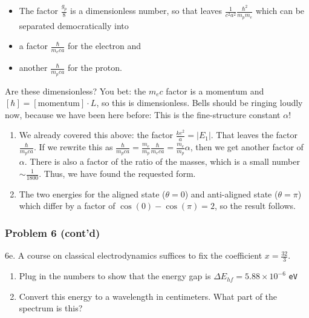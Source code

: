 \documentclass[11pt]{article}
\begin{document}
\begin{itemize}
\item
  The factor \(\frac{g_p}{8}\) is a dimensionless number, so that leaves
  \(\frac1{c^2 a^2}\frac{\hbar^2}{m_p m_e}\) which can be separated
  democratically into
\item
  a factor \(\frac{\hbar}{m_eca}\) for the electron and
\item
  another \(\frac{\hbar}{m_pca}\) for the proton.
\end{itemize}

Are these dimensionless? You bet: the \(m_e c\) factor is a momentum and
\([\hbar] = [\textrm{momentum}]\cdot L\), so this is dimensionless.
Bells should be ringing loudly now, because we have been here before:
This is the fine-structure constant \(\alpha\)!

\begin{enumerate}
\def\labelenumi{\roman{enumi}.}
\setcounter{enumi}{1}
\item
  We already covered this above: the factor \(\frac{ke^2}{a} = |E_1|\).
  That leaves the factor \(\frac{\hbar}{m_pca}\). If we rewrite this as
  \(\frac{\hbar}{m_pca}=\frac{m_e}{m_p}\frac{\hbar}{m_eca}=\frac{m_e}{m_p}\alpha\),
  then we get another factor of \(\alpha\). There is also a factor of
  the ratio of the masses, which is a small number
  \(\sim \frac 1{1800}\). Thus, we have found the requested form.
\item
  The two energies for the aligned state (\(\theta=0\)) and anti-aligned
  state (\(\theta=\pi\)) which differ by a factor of
  \(\cos(0)-\cos(\pi)=2\), so the result follows.
\end{enumerate}
 

     
\subsubsection{Problem 6 (cont'd)}\label{problem-6-contd}

6e. A course on classical electrodynamics suffices to fix the
coefficient \(x=\frac{32}3\).

\begin{enumerate}
\def\labelenumi{\roman{enumi}.}
\item
  Plug in the numbers to show that the energy gap is
  \(\Delta E_{hf} = 5.88\times 10^{-6}\) \texttt{eV}
\item
  Convert this energy to a wavelength in centimeters. What part of the
  spectrum is this?
\end{enumerate}
 
\end{document}
